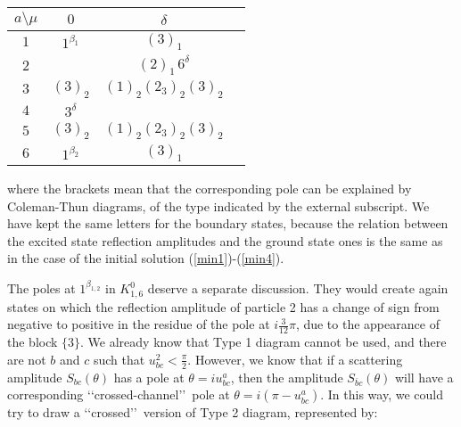 \documentclass[a4paper,12pt]{report}
\begin{document}
\begin{center}
\begin{tabular}{|c|c|c|c|}\hline
 $ a\setminus\mu$  &  $ 0$  &  $\delta$ \\ \hline
  $1$ & $1^{\beta_{1}}$  & $(3)_{1}$   \\ \hline
  $2$ &   & $(2)_{1}\,6^{\delta}$   \\ \hline
  $3$ & $(3)_{2}$  &  $(1)_{2}(2_{3})_{2}(3)_{2}$  \\ \hline
  $4$ & $3^{\delta}$  &    \\ \hline
  $5$ & $(3)_{2}$  &  $(1)_{2}(2_{3})_{2}(3)_{2}$  \\ \hline
  $6$ & $1^{\beta_{2}}$  & $(3)_{1}$   \\ \hline
    \end{tabular}
\end{center}

\vspace{0.5cm}

where the brackets mean that the corresponding pole can be explained by Coleman-Thun diagrams, of the type
indicated by the external subscript. We have kept the same letters for the boundary states, because the relation
between the excited state reflection amplitudes and the ground state ones is the same as in the case of the
initial solution (\ref{min1})-(\ref{min4}).

The poles at $1^{\beta_{1,2}}$ in $K_{1,6}^{0}$ deserve a separate discussion. They would create again states on
which the reflection amplitude of particle 2 has a change of sign from negative to positive in the residue of the
pole at $i\frac{3}{12}\pi$, due to the appearance of the block $\{3\}$. We already know that Type 1 diagram
cannot be used, and there are not $b$ and $c$ such that $u_{bc}^{2}<\frac{\pi}{2}$. However, we know that if a
scattering amplitude $S_{bc}(\theta)$ has a pole at $\theta=i u_{bc}^{a}$, then the amplitude
$S_{\bar{b}c}(\theta)$ will have a corresponding \lq\lq crossed-channel\rq\rq \, pole at
$\theta=i(\pi-u_{bc}^{a})$. In this way, we could try to draw a \lq\lq crossed\rq\rq \, version of Type 2
diagram, represented by:

\vspace{6cm}
\end{document}
